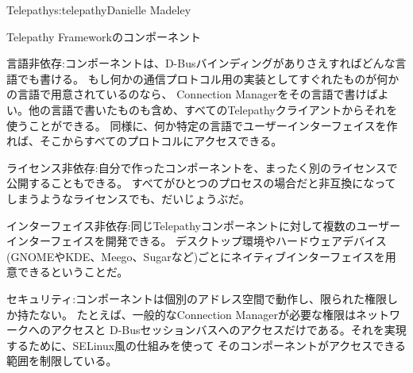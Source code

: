 \begin{aosachapter}{Telepathy}{s:telepathy}{Danielle Madeley}
\begin{aosasect1}{Telepathy Frameworkのコンポーネント}
\begin{aosadescription}
  \item{言語非依存:}コンポーネントは、D-Busバインディングがありさえすればどんな言語でも書ける。
  もし何かの通信プロトコル用の実装としてすぐれたものが何かの言語で用意されているのなら、
  Connection Managerをその言語で書けばよい。他の言語で書いたものも含め、すべてのTelepathyクライアントからそれを使うことができる。
  同様に、何か特定の言語でユーザーインターフェイスを作れば、そこからすべてのプロトコルにアクセスできる。

  \item{ライセンス非依存:}自分で作ったコンポーネントを、まったく別のライセンスで公開することもできる。
  すべてがひとつのプロセスの場合だと非互換になってしまうようなライセンスでも、だいじょうぶだ。

  \item{インターフェイス非依存:}同じTelepathyコンポーネントに対して複数のユーザーインターフェイスを開発できる。
  デスクトップ環境やハードウェアデバイス(GNOMEやKDE、Meego、Sugarなど)ごとにネイティブインターフェイスを用意できるということだ。

  \item{セキュリティ:}コンポーネントは個別のアドレス空間で動作し、限られた権限しか持たない。
  たとえば、一般的なConnection Managerが必要な権限はネットワークへのアクセスと
  D-Busセッションバスへのアクセスだけである。それを実現するために、SELinux風の仕組みを使って
  そのコンポーネントがアクセスできる範囲を制限している。


\end{aosadescription}
\end{aosasect1}
\end{aosachapter}
